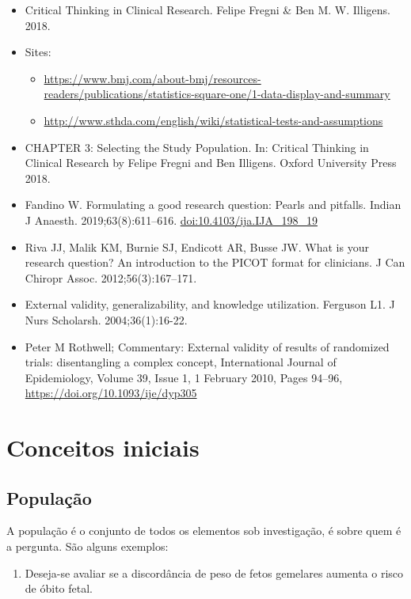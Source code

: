 \documentclass[
]{book}
\providecommand{\tightlist}{%
  \setlength{\itemsep}{0pt}\setlength{\parskip}{0pt}}
\begin{document}
\begin{itemize}
\item
  Critical Thinking in Clinical Research. Felipe Fregni \& Ben M. W. Illigens. 2018.
\item
  Sites:

  \begin{itemize}
  \item
    \url{https://www.bmj.com/about-bmj/resources-readers/publications/statistics-square-one/1-data-display-and-summary}
  \item
    \url{http://www.sthda.com/english/wiki/statistical-tests-and-assumptions}
  \end{itemize}
\item
  CHAPTER 3: Selecting the Study Population. In: Critical Thinking in Clinical Research by Felipe Fregni and Ben Illigens. Oxford University Press 2018.
\item
  Fandino W. Formulating a good research question: Pearls and pitfalls. Indian J Anaesth. 2019;63(8):611--616. \url{doi:10.4103/ija.IJA_198_19}
\item
  Riva JJ, Malik KM, Burnie SJ, Endicott AR, Busse JW. What is your research question? An introduction to the PICOT format for clinicians. J Can Chiropr Assoc. 2012;56(3):167--171.
\item
  External validity, generalizability, and knowledge utilization. Ferguson L1. J Nurs Scholarsh. 2004;36(1):16-22.
\item
  Peter M Rothwell; Commentary: External validity of results of randomized trials: disentangling a complex concept, International Journal of Epidemiology, Volume 39, Issue 1, 1 February 2010, Pages 94--96, \url{https://doi.org/10.1093/ije/dyp305}
\end{itemize}

\hypertarget{conceitos}{%
\chapter{Conceitos iniciais}\label{conceitos}}

\hypertarget{populauxe7uxe3o}{%
\section{População}\label{populauxe7uxe3o}}

A população é o conjunto de todos os elementos sob investigação, é sobre quem é a pergunta. São alguns exemplos:

\begin{enumerate}
\def\labelenumi{\arabic{enumi}.}
\tightlist
\item
  Deseja-se avaliar se a discordância de peso de fetos gemelares aumenta o risco de óbito fetal.
\end{enumerate}
\end{document}
